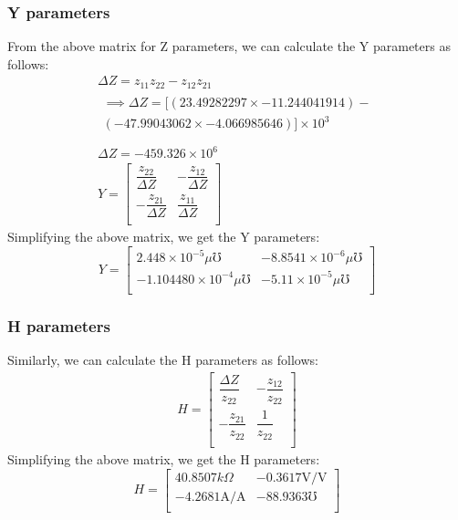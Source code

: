 \documentclass[titlepage]{article}
\begin{document}
\subsubsection{Y parameters}
From the above matrix for Z parameters, we can calculate the Y parameters as follows:
\begin{gather*}
    \Delta Z = z_{11}z_{22}-z_{12}z_{21}\\
    \begin{split}
        \implies \Delta Z = [(23.49282297\times-11.244041914)-\\
        (-47.99043062\times-4.066985646)]\times 10^3\\
    \end{split}\\
    \Delta Z =-459.326\times 10^6\\
    Y = \begin{bmatrix}
        \dfrac{z_{22}}{\Delta Z}  & -\dfrac{z_{12}}{\Delta Z} \\[2ex]
        -\dfrac{z_{21}}{\Delta Z} & \dfrac{z_{11}}{\Delta Z}  \\[2ex]
    \end{bmatrix}
\end{gather*}
Simplifying the above matrix, we get the Y parameters:
$$ Y = \begin{bmatrix}
        2.448 \times 10^{-5}\mu\mho    & -8.8541\times10^{-6}\mu\mho \\[1ex]
        -1.104480\times 10^{-4}\mu\mho & -5.11\times 10^{-5}\mu\mho  \\[1ex]
    \end{bmatrix}
$$
\subsubsection{H parameters}

Similarly, we can calculate the H parameters as follows:
\begin{gather*}
    H = \begin{bmatrix}
        \dfrac{\Delta Z}{z_{22}} & -\dfrac{z_{12}}{z_{22}} \\[2ex]
        -\dfrac{z_{21}}{z_{22}}  & \dfrac{1}{z_{22}}       \\[2ex]
    \end{bmatrix}
\end{gather*}
Simplifying the above matrix, we get the H parameters:
$$ H = \begin{bmatrix}
        40.8507k\Omega      & -0.3617 \mathrm{V/V} \\[1ex]
        -4.2681\mathrm{A/A} & -88.9363\mho         \\[1ex]
    \end{bmatrix}
$$
\newpage
\end{document}
